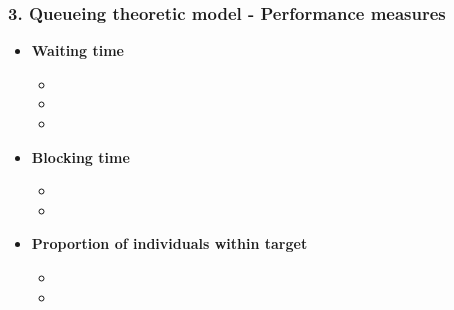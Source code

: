 \begin{frame}
    \frametitle{3. Queueing theoretic model - Performance measures}
    \large

    \begin{itemize}
        \item \textbf{Waiting time}
        \begin{itemize}
            \item \color{teal}{Recursive formula}
            \item \color{teal}{Direct formula}
            \item \color{teal}{Closed-form formula}
        \end{itemize}
        \item \textbf{Blocking time}
        \begin{itemize}
            \item \color{teal}{Direct formula}
            \item \color{purple}{Closed-form formula}
        \end{itemize}
        \item \textbf{Proportion of individuals within target}
        \begin{itemize}
            \item \color{teal}{Generic \(\Psi\) function}
            \item \color{teal}{Specific \(\Psi\) function}
        \end{itemize}
    \end{itemize}

\end{frame}


